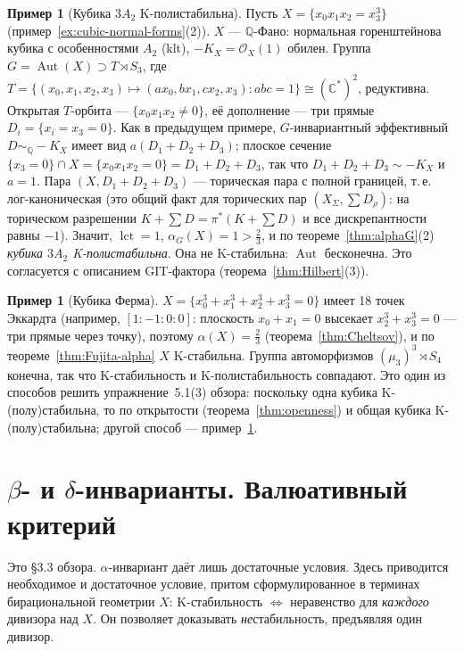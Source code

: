 \documentclass[11pt,a4paper]{article}
\theoremstyle{plain}
\theoremstyle{definition}
\newtheorem{example}[theorem]{Пример}
\theoremstyle{remark}
\renewcommand{\C}{\mathbb{C}}
\newcommand{\Q}{\mathbb{Q}}
\newcommand{\cO}{\mathcal{O}}
\DeclareMathOperator{\Aut}{Aut}
\DeclareMathOperator{\lct}{lct}
\begin{document}
\begin{example}[Кубика $3A_2$ K-полистабильна]\label{ex:3A2-polystable}
Пусть $X=\{x_0x_1x_2=x_3^3\}$ (пример~\ref{ex:cubic-normal-forms}(2)). $X$ --- $\Q$-Фано: нормальная
горенштейнова кубика с особенностями $A_2$ (klt), $-K_X=\cO_X(1)$ обилен. Группа
$G=\Aut(X)\supset T\rtimes S_3$, где $T=\{(x_0,x_1,x_2,x_3)\mapsto(ax_0,bx_1,cx_2,x_3):abc=1\}\cong(\C^*)^2$,
редуктивна. Открытая $T$-орбита --- $\{x_0x_1x_2\ne0\}$, её дополнение --- три прямые
$D_i=\{x_i=x_3=0\}$. Как в предыдущем примере, $G$-инвариантный эффективный $D\sim_\Q-K_X$ имеет вид
$a(D_1+D_2+D_3)$; плоское сечение $\{x_3=0\}\cap X=\{x_0x_1x_2=0\}=D_1+D_2+D_3$, так что
$D_1+D_2+D_3\sim-K_X$ и $a=1$. Пара $(X,D_1+D_2+D_3)$ --- торическая пара с полной границей,
т.\,е. лог-каноническая (это общий факт для торических пар $(X_\Sigma,\sum D_\rho)$: на торическом
разрешении $K+\sum D=\pi^*(K+\sum D)$ и все дискрепантности равны $-1$). Значит, $\lct=1$,
$\alpha_G(X)=1>\frac23$, и по теореме~\ref{thm:alphaG}(2) \emph{кубика $3A_2$ K-полистабильна}.
Она не K-стабильна: $\Aut$ бесконечна. Это согласуется с описанием GIT-фактора
(теорема~\ref{thm:Hilbert}(3)).
\end{example}

\begin{example}[Кубика Ферма]
$X=\{x_0^3+x_1^3+x_2^3+x_3^3=0\}$ имеет 18 точек Эккардта (например, $[1:-1:0:0]$: плоскость
$x_0+x_1=0$ высекает $x_2^3+x_3^3=0$ --- три прямые через точку), поэтому $\alpha(X)=\frac23$
(теорема~\ref{thm:Cheltsov}), и по теореме~\ref{thm:Fujita-alpha} $X$ K-стабильна. Группа
автоморфизмов $(\mu_3)^3\rtimes S_4$ конечна, так что K-стабильность и K-полистабильность
совпадают. Это один из способов решить упражнение~5.1(3) обзора: поскольку одна кубика K-(полу)стабильна,
то по открытости (теорема~\ref{thm:openness}) и общая кубика K-(полу)стабильна; другой способ ---
пример~\ref{ex:3A2-polystable}.
\end{example}

\section{\texorpdfstring{$\beta$}{β}- и \texorpdfstring{$\delta$}{δ}-инварианты. Валюативный критерий}\label{sec:beta}

Это \S3.3 обзора. $\alpha$-инвариант даёт лишь достаточные условия. Здесь приводится
необходимое и достаточное условие, притом сформулированное в терминах бирациональной геометрии
$X$: K-стабильность $\iff$ неравенство для \emph{каждого} дивизора над $X$. Он позволяет доказывать
\emph{не}стабильность, предъявляя один дивизор.
\end{document}
